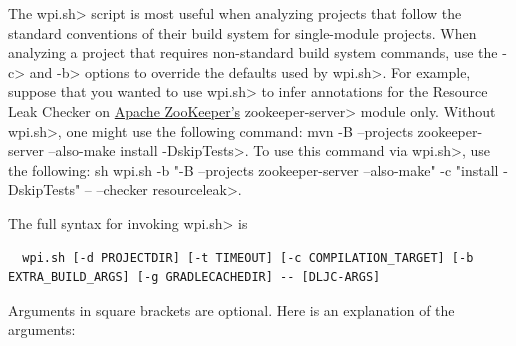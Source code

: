 The \<wpi.sh> script is most useful when analyzing projects that follow the standard
conventions of their build system for single-module projects. When analyzing a project
that requires non-standard build system commands, use the \<-c> and \<-b> options to
override the defaults used by \<wpi.sh>. For example, suppose that you wanted to use
\<wpi.sh> to infer annotations for the Resource Leak Checker on
\href{https://github.com/apache/zookeeper}{Apache ZooKeeper's}
\<zookeeper-server> module only. Without \<wpi.sh>, one might use the following command:
\<mvn -B --projects zookeeper-server --also-make install -DskipTests>. To use this command via
\<wpi.sh>, use the following:
\<sh wpi.sh -b "-B --projects zookeeper-server --also-make" -c "install -DskipTests" -- --checker resourceleak>.

The full syntax for invoking \<wpi.sh> is

\begin{Verbatim}
  wpi.sh [-d PROJECTDIR] [-t TIMEOUT] [-c COMPILATION_TARGET] [-b EXTRA_BUILD_ARGS] [-g GRADLECACHEDIR] -- [DLJC-ARGS]
\end{Verbatim}

Arguments in square brackets are optional.
Here is an explanation of the arguments:

